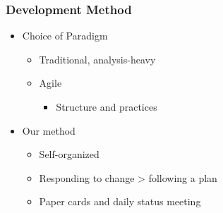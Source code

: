 \begin{frame}
    \frametitle{Development Method}
    \begin{itemize}
			\item Choice of Paradigm
		  \begin{itemize}
				\item Traditional, analysis-heavy
				\item Agile
				\begin{itemize}
					\item Structure and practices
				\end{itemize}
			\end{itemize}
			\item Our method
			\begin{itemize}
				\item Self-organized
				\item Responding to change > following a plan
				\item Paper cards and daily status meeting
			\end{itemize}
		\end{itemize}
\end{frame}

